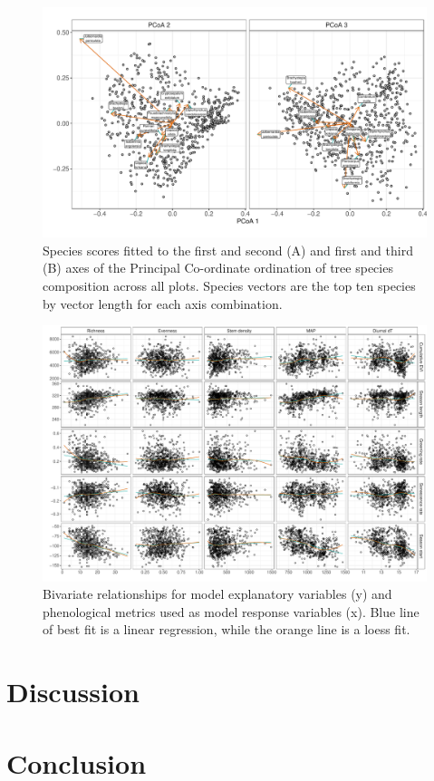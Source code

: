 \documentclass[11pt,a4paper]{article}
\begin{document}
\begin{figure}[H]
\centering
	\includegraphics[width=\textwidth]{pcoa.pdf}
	\caption{Species scores fitted to the first and second (A) and first and third (B) axes of the Principal Co-ordinate ordination of tree species composition across all plots. Species vectors are the top ten species by vector length for each axis combination.}
	\label{pcoa}
\end{figure}

\begin{landscape}
\begin{figure}
\centering
	\includegraphics[width=1.4\textwidth]{bivar}
	\caption{Bivariate relationships for model explanatory variables (y) and phenological metrics used as model response variables (x). Blue line of best fit is a linear regression, while the orange line is a loess fit.}
	\label{bivar}
\end{figure}
\end{landscape}

\section{Discussion}

\section{Conclusion}


\end{document}
